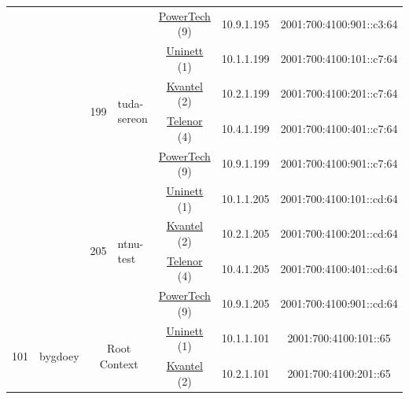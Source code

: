 \begin{small}
\begin{center}
\begin{longtable}{|c|c|c|c|c|c|c|c|}
  &  &  &  & \multicolumn{2}{|c|}{\tiny{\href{http://www.powertech.no}{PowerTech} (9)}} & \tiny{10.9.1.195} & \tiny{2001:700:4100:901::c3:64} \\* \cline{3-3}\cline{4-4}\cline{5-5}\cline{6-6}\cline{7-7}\cline{8-8}
  &  & \multirow{4}{*}{\tiny{199}} & \multicolumn{1}{|l|}{\multirow{4}{*}{\tiny{tuda-sereon}}} & \multicolumn{2}{|c|}{\tiny{\href{https://www.uninett.no}{Uninett} (1)}} & \tiny{10.1.1.199} & \tiny{2001:700:4100:101::c7:64} \\* \cline{5-5}\cline{6-6}\cline{7-7}\cline{8-8}
  &  &  &  & \multicolumn{2}{|c|}{\tiny{\href{http://kvantel.no}{Kvantel} (2)}} & \tiny{10.2.1.199} & \tiny{2001:700:4100:201::c7:64} \\* \cline{5-5}\cline{6-6}\cline{7-7}\cline{8-8}
  &  &  &  & \multicolumn{2}{|c|}{\tiny{\href{https://www.telenor.no}{Telenor} (4)}} & \tiny{10.4.1.199} & \tiny{2001:700:4100:401::c7:64} \\* \cline{5-5}\cline{6-6}\cline{7-7}\cline{8-8}
  &  &  &  & \multicolumn{2}{|c|}{\tiny{\href{http://www.powertech.no}{PowerTech} (9)}} & \tiny{10.9.1.199} & \tiny{2001:700:4100:901::c7:64} \\* \cline{3-3}\cline{4-4}\cline{5-5}\cline{6-6}\cline{7-7}\cline{8-8}
  &  & \multirow{4}{*}{\tiny{205}} & \multicolumn{1}{|l|}{\multirow{4}{*}{\tiny{ntnu-test}}} & \multicolumn{2}{|c|}{\tiny{\href{https://www.uninett.no}{Uninett} (1)}} & \tiny{10.1.1.205} & \tiny{2001:700:4100:101::cd:64} \\* \cline{5-5}\cline{6-6}\cline{7-7}\cline{8-8}
  &  &  &  & \multicolumn{2}{|c|}{\tiny{\href{http://kvantel.no}{Kvantel} (2)}} & \tiny{10.2.1.205} & \tiny{2001:700:4100:201::cd:64} \\* \cline{5-5}\cline{6-6}\cline{7-7}\cline{8-8}
  &  &  &  & \multicolumn{2}{|c|}{\tiny{\href{https://www.telenor.no}{Telenor} (4)}} & \tiny{10.4.1.205} & \tiny{2001:700:4100:401::cd:64} \\* \cline{5-5}\cline{6-6}\cline{7-7}\cline{8-8}
  &  &  &  & \multicolumn{2}{|c|}{\tiny{\href{http://www.powertech.no}{PowerTech} (9)}} & \tiny{10.9.1.205} & \tiny{2001:700:4100:901::cd:64} \\ \hline
 \multirow{48}{*}{\tiny{101}} & \multicolumn{1}{|l|}{\multirow{48}{*}{\tiny{bygdoey}}} & \multicolumn{2}{|c|}{\multirow{4}{*}{\tiny{Root Context}}} & \multicolumn{2}{|c|}{\tiny{\href{https://www.uninett.no}{Uninett} (1)}} & \tiny{10.1.1.101} & \tiny{2001:700:4100:101::65} \\* \cline{5-5}\cline{6-6}\cline{7-7}\cline{8-8}
  &  & \multicolumn{2}{|c|}{} & \multicolumn{2}{|c|}{\tiny{\href{http://kvantel.no}{Kvantel} (2)}} & \tiny{10.2.1.101} & \tiny{2001:700:4100:201::65} \\* \cline{5-5}\cline{6-6}\cline{7-7}\cline{8-8}

\end{longtable}
\end{center}
\end{small}
